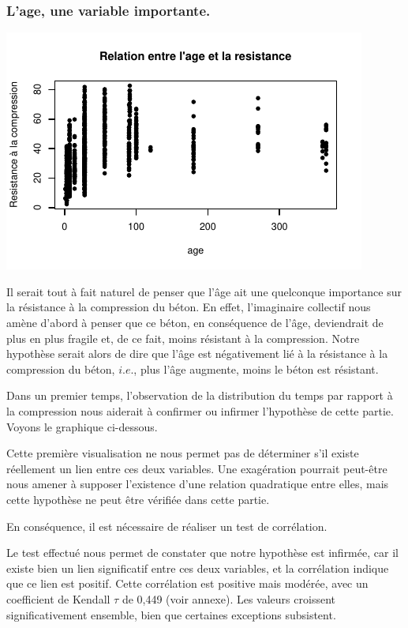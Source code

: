 \documentclass[
  12pt,
]{article}
\begin{document}
\subsubsection{L'age, une variable
importante.}\label{lage-une-variable-importante.}

\begin{center}\includegraphics{rmd_final_files/figure-latex/unnamed-chunk-12-1} \end{center}

Il serait tout à fait naturel de penser que l'âge ait une quelconque
importance sur la résistance à la compression du béton. En effet,
l'imaginaire collectif nous amène d'abord à penser que ce béton, en
conséquence de l'âge, deviendrait de plus en plus fragile et, de ce
fait, moins résistant à la compression. Notre hypothèse serait alors de
dire que l'âge est négativement lié à la résistance à la compression du
béton, \(i.e.\), plus l'âge augmente, moins le béton est résistant.

Dans un premier temps, l'observation de la distribution du temps par
rapport à la compression nous aiderait à confirmer ou infirmer
l'hypothèse de cette partie. Voyons le graphique ci-dessous.

Cette première visualisation ne nous permet pas de déterminer s'il
existe réellement un lien entre ces deux variables. Une exagération
pourrait peut-être nous amener à supposer l'existence d'une relation
quadratique entre elles, mais cette hypothèse ne peut être vérifiée dans
cette partie.

En conséquence, il est nécessaire de réaliser un test de corrélation.

Le test effectué nous permet de constater que notre hypothèse est
infirmée, car il existe bien un lien significatif entre ces deux
variables, et la corrélation indique que ce lien est positif. Cette
corrélation est positive mais modérée, avec un coefficient de Kendall
\(\tau\) de 0,449 (voir annexe). Les valeurs croissent significativement
ensemble, bien que certaines exceptions subsistent.
\end{document}
